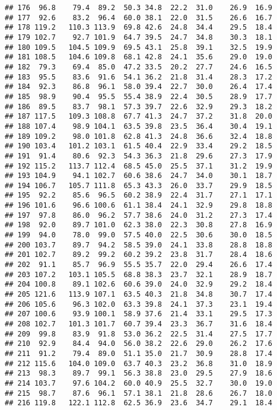 \documentclass[
]{book}
\theoremstyle{definition}
\theoremstyle{definition}
\theoremstyle{definition}
\theoremstyle{definition}
\theoremstyle{remark}
\begin{document}
\begin{verbatim}
## 176  96.8    79.4  89.2  50.3 34.8  22.2  31.0    26.9  16.9
## 177  92.6    83.2  96.4  60.0 38.1  22.0  31.5    26.6  16.7
## 178 119.2   110.3 113.9  69.8 42.6  24.8  34.4    29.5  18.4
## 179 102.7    92.7 101.9  64.7 39.5  24.7  34.8    30.3  18.1
## 180 109.5   104.5 109.9  69.5 43.1  25.8  39.1    32.5  19.9
## 181 108.5   104.6 109.8  68.1 42.8  24.1  35.6    29.0  19.0
## 182  79.3    69.4  85.0  47.2 33.5  20.2  27.7    24.6  16.5
## 183  95.5    83.6  91.6  54.1 36.2  21.8  31.4    28.3  17.2
## 184  92.3    86.8  96.1  58.0 39.4  22.7  30.0    26.4  17.4
## 185  98.9    90.4  95.5  55.4 38.9  22.4  30.5    28.9  17.7
## 186  89.5    83.7  98.1  57.3 39.7  22.6  32.9    29.3  18.2
## 187 117.5   109.3 108.8  67.7 41.3  24.7  37.2    31.8  20.0
## 188 107.4    98.9 104.1  63.5 39.8  23.5  36.4    30.4  19.1
## 189 109.2    98.0 101.8  62.8 41.3  24.8  36.6    32.4  18.8
## 190 103.4   101.2 103.1  61.5 40.4  22.9  33.4    29.2  18.5
## 191  91.4    80.6  92.3  54.3 36.3  21.8  29.6    27.3  17.9
## 192 115.2   113.7 112.4  68.5 45.0  25.5  37.1    31.2  19.9
## 193 104.9    94.1 102.7  60.6 38.6  24.7  34.0    30.1  18.7
## 194 106.7   105.7 111.8  65.3 43.3  26.0  33.7    29.9  18.5
## 195  92.2    85.6  96.5  60.2 38.9  22.4  31.7    27.1  17.1
## 196 101.6    96.6 100.6  61.1 38.4  24.1  32.9    29.8  18.8
## 197  97.8    86.0  96.2  57.7 38.6  24.0  31.2    27.3  17.4
## 198  92.0    89.7 101.0  62.3 38.0  22.3  30.8    27.8  16.9
## 199  94.0    78.0  99.0  57.5 40.0  22.5  30.6    30.0  18.5
## 200 103.7    89.7  94.2  58.5 39.0  24.1  33.8    28.8  18.8
## 201 102.7    89.2  99.2  60.2 39.2  23.8  31.7    28.4  18.6
## 202  91.1    85.7  96.9  55.5 35.7  22.0  29.4    26.6  17.4
## 203 107.2   103.1 105.5  68.8 38.3  23.7  32.1    28.9  18.7
## 204 100.8    89.1 102.6  60.6 39.0  24.0  32.9    29.2  18.4
## 205 121.6   113.9 107.1  63.5 40.3  21.8  34.8    30.7  17.4
## 206 105.6    96.3 102.0  63.3 39.8  24.1  37.3    23.1  19.4
## 207 100.6    93.9 100.1  58.9 37.6  21.4  33.1    29.5  17.3
## 208 102.7   101.3 101.7  60.7 39.4  23.3  36.7    31.6  18.4
## 209  99.8    83.9  91.8  53.0 36.2  22.5  31.4    27.5  17.7
## 210  92.9    84.4  94.0  56.0 38.2  22.6  29.0    26.2  17.6
## 211  91.2    79.4  89.0  51.1 35.0  21.7  30.9    28.8  17.4
## 212 115.6   104.0 109.0  63.7 40.3  23.2  36.8    31.0  18.9
## 213  98.3    89.7  99.1  56.3 38.8  23.0  29.5    27.9  18.6
## 214 103.7    97.6 104.2  60.0 40.9  25.5  32.7    30.0  19.0
## 215  98.7    87.6  96.1  57.1 38.1  21.8  28.6    26.7  18.0
## 216 119.8   122.1 112.8  62.5 36.9  23.6  34.7    29.1  18.4

\end{verbatim}
\end{document}
